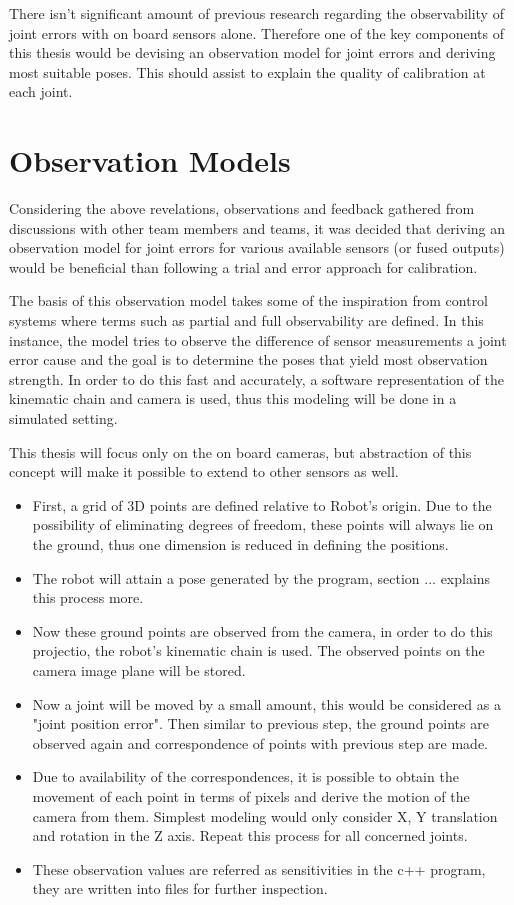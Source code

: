 \documentclass[english, printversion, nomenclature, notitle]{tuvisionthesis} %
\begin{document}
There isn't significant amount of previous research regarding the observability of joint errors with on board sensors alone. Therefore one of the key components of this thesis would be devising an observation model for joint errors and deriving most suitable poses. This should assist to explain the quality of calibration at each joint.

\section{Observation Models}
Considering the above revelations, observations and feedback gathered from discussions with other team members and teams, it was decided that deriving an observation model for joint errors for various available sensors (or fused outputs) would be beneficial than following a trial and error approach for calibration.

The basis of this observation model takes some of the inspiration from control systems where terms such as partial and full observability are defined. In this instance, the model tries to observe the difference of sensor measurements a joint error cause and the goal is to determine the poses that yield most observation strength. In order to do this fast and accurately, a software representation of the kinematic chain and camera is used, thus this modeling will be done in a simulated setting.

This thesis will focus only on the on board cameras, but abstraction of this concept will make it possible to extend to other sensors as well.

\begin{itemize}
	\item First, a grid of 3D points are defined relative to Robot's origin. Due to the possibility of eliminating degrees of freedom, these points will always lie on the ground, thus one dimension is reduced in defining the positions.
	\item The robot will attain a pose generated by the program, section ...  explains this process more.
	\item Now these ground points are observed from the camera, in order to do this projectio, the robot's kinematic chain is used. The observed points on the camera image plane will be stored.
	\item Now a joint will be moved by a small amount, this would be considered as a "joint position error". Then similar to previous step, the ground points are observed again and correspondence of points with previous step are made.
	\item Due to availability of the correspondences, it is possible to obtain the movement of each point in terms of pixels and derive the motion of the camera from them. Simplest modeling would only consider X, Y translation and rotation in the Z axis. Repeat this process for all concerned joints.
	\item These observation values are referred as sensitivities in the c++ program, they are written into files for further inspection.	
\end{itemize}
\end{document}
